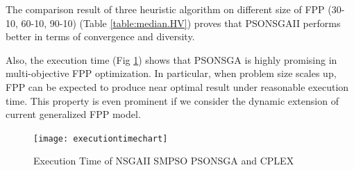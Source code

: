 \documentclass[10pt,journal,compsoc]{IEEEtran}
\begin{document}
The comparison result of three heuristic algorithm on different size of FPP (30-10, 60-10, 90-10) (Table \ref{table:median.HV}) proves that PSONSGAII performs better in terms of convergence and diversity.
\begin{table}[h]
\caption{Hyper-Volume Indicator on Three Heuristic Algorithms}
\label{table:median.HV}
\end{table}

Also, the execution time (Fig \ref{eta}) shows that PSONSGA is highly promising in multi-objective FPP optimization. In particular, when problem size scales up, FPP can be expected to produce near optimal result under reasonable execution time. This property is even prominent if we consider the dynamic extension of current generalized FPP model. 

\begin{figure}[ht]
\centerline{\texttt{[image: executiontimechart]}}
\caption{Execution Time of NSGAII SMPSO PSONSGA and CPLEX} 
\label{eta}
\end{figure}
\fi







%
%
\end{document}

